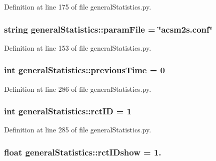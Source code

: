 \-Definition at line 175 of file general\-Statistics.\-py.

\hypertarget{namespacegeneral_statistics_a84a4d4e74b9c4bceedf625a578c8ddec}{
\subsubsection[{param\-File}]{\setlength{\rightskip}{0pt plus 5cm}string {\bf general\-Statistics\-::param\-File} = \char`\"{}acsm2s.\-conf\char`\"{}}}\label{namespacegeneral_statistics_a84a4d4e74b9c4bceedf625a578c8ddec}


\-Definition at line 153 of file general\-Statistics.\-py.

\hypertarget{namespacegeneral_statistics_af0ac4abd35899cf6efdc0422a6d97c35}{
\subsubsection[{previous\-Time}]{\setlength{\rightskip}{0pt plus 5cm}int {\bf general\-Statistics\-::previous\-Time} = 0}}\label{namespacegeneral_statistics_af0ac4abd35899cf6efdc0422a6d97c35}


\-Definition at line 286 of file general\-Statistics.\-py.

\hypertarget{namespacegeneral_statistics_a1d30aa03b17d083ca247d3fc75d12882}{
\subsubsection[{rct\-I\-D}]{\setlength{\rightskip}{0pt plus 5cm}int {\bf general\-Statistics\-::rct\-I\-D} = 1}}\label{namespacegeneral_statistics_a1d30aa03b17d083ca247d3fc75d12882}


\-Definition at line 285 of file general\-Statistics.\-py.

\hypertarget{namespacegeneral_statistics_ad203c6e593d0dda94aa3de01f64438f1}{
\subsubsection[{rct\-I\-Dshow}]{\setlength{\rightskip}{0pt plus 5cm}float {\bf general\-Statistics\-::rct\-I\-Dshow} = 1.}}\label{namespacegeneral_statistics_ad203c6e593d0dda94aa3de01f64438f1}


